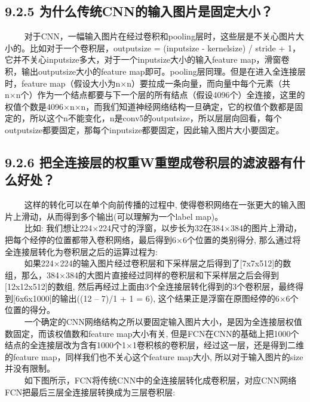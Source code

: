 \subsection{9.2.5
为什么传统CNN的输入图片是固定大小？}\label{ux4e3aux4ec0ux4e48ux4f20ux7edfcnnux7684ux8f93ux5165ux56feux7247ux662fux56faux5b9aux5927ux5c0f}

  
对于CNN，一幅输入图片在经过卷积和pooling层时，这些层是不关心图片大小的。比如对于一个卷积层，outputsize
= (inputsize - kernelsize) / stride +
1，它并不关心inputsize多大，对于一个inputsize大小的输入feature
map，滑窗卷积，输出outputsize大小的feature
map即可。pooling层同理。但是在进入全连接层时，feature
map（假设大小为n×n）要拉成一条向量，而向量中每个元素（共n×n个）作为一个结点都要与下一个层的所有结点（假设4096个）全连接，这里的权值个数是4096×n×n，而我们知道神经网络结构一旦确定，它的权值个数都是固定的，所以这个n不能变化，n是conv5的outputsize，所以层层向回看，每个outputsize都要固定，那每个inputsize都要固定，因此输入图片大小要固定。

\subsection{9.2.6
把全连接层的权重W重塑成卷积层的滤波器有什么好处？}\label{ux628aux5168ux8fdeux63a5ux5c42ux7684ux6743ux91cdwux91cdux5851ux6210ux5377ux79efux5c42ux7684ux6ee4ux6ce2ux5668ux6709ux4ec0ux4e48ux597dux5904}

   这样的转化可以在单个向前传播的过程中,
使得卷积网络在一张更大的输入图片上滑动，从而得到多个输出(可以理解为一个label
map)。\\
   比如:
我们想让224×224尺寸的浮窗，以步长为32在384×384的图片上滑动，把每个经停的位置都带入卷积网络，最后得到6×6个位置的类别得分,
那么通过将全连接层转化为卷积层之后的运算过程为:\\
  
如果224×224的输入图片经过卷积层和下采样层之后得到了{[}7x7x512{]}的数组，那么，384×384的大图片直接经过同样的卷积层和下采样层之后会得到{[}12x12x512{]}的数组,
然后再经过上面由3个全连接层转化得到的3个卷积层，最终得到{[}6x6x1000{]}的输出((12
-- 7)/1 + 1 = 6), 这个结果正是浮窗在原图经停的6×6个位置的得分。\\
  
一个确定的CNN网络结构之所以要固定输入图片大小，是因为全连接层权值数固定，而该权值数和feature
map大小有关,
但是FCN在CNN的基础上把1000个结点的全连接层改为含有1000个1×1卷积核的卷积层，经过这一层，还是得到二维的feature
map，同样我们也不关心这个feature map大小,
所以对于输入图片的size并没有限制。\\
  
如下图所示，FCN将传统CNN中的全连接层转化成卷积层，对应CNN网络FCN把最后三层全连接层转换成为三层卷积层:

